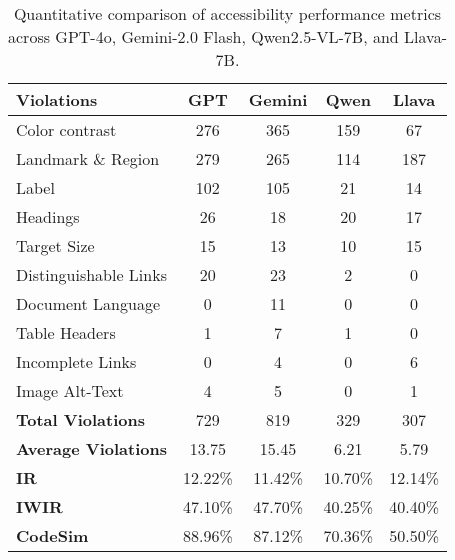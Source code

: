 \renewcommand{\arraystretch}{1.1}
\begin{table}
\tabcolsep=0.5cm
\centering
\small

\begin{tabular}{l|c|c|c|c} 
\hline
\rowcolor{lightgray} \textbf{Violations} & \textbf{GPT} & \textbf{Gemini} & \textbf{Qwen} & \textbf{Llava}  \\ 
\hline
Color contrast & 276 & 365 & 159 & 67 \\
\hline
Landmark \& Region & 279 & 265 & 114 & 187 \\
\hline
Label & 102 & 105 & 21 & 14 \\
\hline
Headings & 26 & 18 & 20 & 17 \\
\hline
Target Size & 15 & 13 & 10 & 15 \\
\hline
Distinguishable Links & 20 & 23 & 2 & 0 \\
\hline
Document Language & 0 & 11 & 0 & 0 \\
\hline
Table Headers & 1 & 7 & 1 & 0 \\
\hline
Incomplete Links & 0 & 4 & 0 & 6 \\
\hline
Image Alt-Text & 4 & 5 & 0 & 1 \\
\hline
\hline
\textbf{Total Violations} & 729 & 819 & 329 & 307 \\
\hline
\textbf{Average Violations} & 13.75 & 15.45 & 6.21 & 5.79 \\
\hline
\textbf{IR} & 12.22\% & 11.42\% & 10.70\% & 12.14\% \\
\hline
\textbf{IWIR} & 47.10\% & 47.70\% & 40.25\% & 40.40\% \\
\hline
\textbf{CodeSim} & 88.96\% & 87.12\% & 70.36\% & 50.50\% \\
\hline
\end{tabular}
\caption{Quantitative comparison of accessibility performance metrics across GPT-4o, Gemini-2.0 Flash, Qwen2.5-VL-7B, and Llava-7B.}
\label{tab:table-performance}
\end{table}
